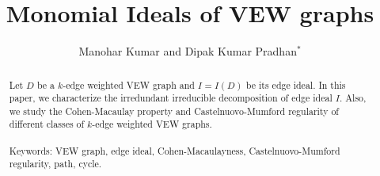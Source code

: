 \documentclass[11pt,reqno]{amsart}
\title[Monomial Ideals of VEW graphs] {Monomial Ideals of VEW graphs}
\author[ M. Kumar and D.K. Pradhan ]{Manohar Kumar and Dipak Kumar Pradhan$^*$  }
\theoremstyle{definition}
\begin{document}
\maketitle

\begin{abstract}
Let $D$ be a $k$-edge weighted VEW graph and $I=I(D)$ be its edge ideal. In this paper,  we characterize the irredundant irreducible decomposition of edge ideal $I$. Also, we study the Cohen-Macaulay property and Castelnuovo-Mumford regularity of different classes of $k$-edge weighted VEW graphs.\\
\\
\noindent Keywords: VEW graph, edge ideal, Cohen-Macaulayness,  Castelnuovo-Mumford regularity, path, cycle.    
\end{abstract}


 
\end{document}
